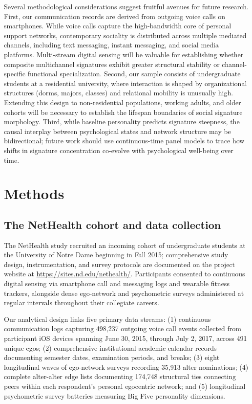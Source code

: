 \documentclass[11pt,letterpaper]{article}
\begin{document}
Several methodological considerations suggest fruitful avenues for future research. First, our communication records are derived from outgoing voice calls on smartphones. While voice calls capture the high-bandwidth core of personal support networks, contemporary sociality is distributed across multiple mediated channels, including text messaging, instant messaging, and social media platforms. Multi-stream digital sensing will be valuable for establishing whether composite multichannel signatures exhibit greater structural stability or channel-specific functional specialization.\cite{heydari2018multichannel,li2022evidence} Second, our sample consists of undergraduate students at a residential university, where interaction is shaped by organizational structures (dorms, majors, classes) and relational mobility is unusually high. Extending this design to non-residential populations, working adults, and older cohorts will be necessary to establish the lifespan boundaries of social signature morphology. Third, while baseline personality predicts signature steepness, the causal interplay between psychological states and network structure may be bidirectional; future work should use continuous-time panel models to trace how shifts in signature concentration co-evolve with psychological well-being over time.

\section*{Methods}

\subsection*{The NetHealth cohort and data collection}
The NetHealth study recruited an incoming cohort of undergraduate students at the University of Notre Dame beginning in Fall 2015;\cite{liu2018network,purta2016experiences,faust2017exploring} comprehensive study design, instrumentation, and survey protocols are documented on the project website at \url{https://sites.nd.edu/nethealth/}. Participants consented to continuous digital sensing via smartphone call and messaging logs and wearable fitness trackers, alongside dense ego-network and psychometric surveys administered at regular intervals throughout their collegiate careers. 

Our analytical design links five primary data streams: (1) continuous communication logs capturing 498,237 outgoing voice call events collected from participant iOS devices spanning June 30, 2015, through July 2, 2017, across 491 unique egos; (2) comprehensive institutional academic calendar records documenting semester dates, examination periods, and breaks; (3) eight longitudinal waves of ego-network surveys recording 35,913 alter nominations; (4) complete alter-alter edge lists documenting 174,748 structural ties connecting peers within each respondent's personal egocentric network; and (5) longitudinal psychometric survey batteries measuring Big Five personality dimensions.
\end{document}
